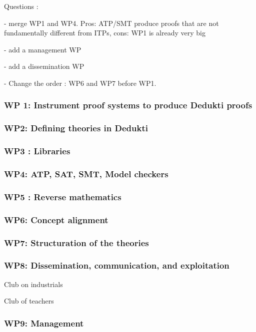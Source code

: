 {\color{red}

Questions :

- merge WP1 and WP4. Pros: ATP/SMT produce proofs that are not fundamentally
different from ITPs, cons: WP1 is already very big

- add a management WP

- add a dissemination WP

- Change the order : WP6 and WP7 before WP1.  
}


\subsubsection{WP 1: Instrument proof systems to produce Dedukti proofs}



\subsubsection{WP2: Defining theories in Dedukti}



\subsubsection{WP3 : Libraries}



\subsubsection{WP4: ATP, SAT, SMT, Model checkers}



\subsubsection{WP5 : Reverse mathematics}



\subsubsection{WP6: Concept alignment}



\subsubsection{WP7: Structuration of the theories}



\subsubsection{WP8: Dissemination, communication, and exploitation}

Club on industrials

Club of teachers

\subsubsection{WP9: Management}

